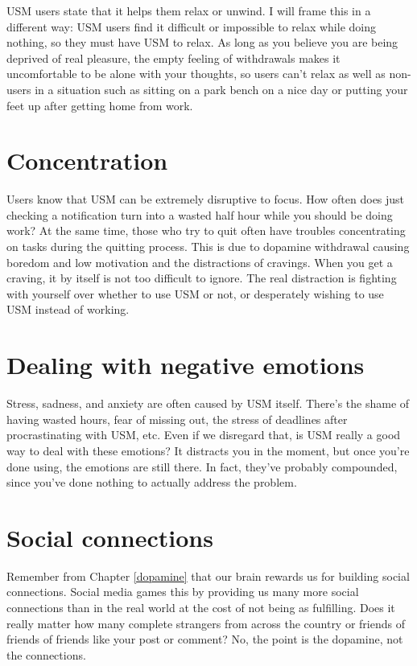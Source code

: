 \documentclass[
  openany]{book}
\begin{document}
USM users state that it helps them relax or unwind. I will frame this in a different way: USM users find it difficult or impossible to relax while doing nothing, so they must have USM to relax. As long as you believe you are being deprived of real pleasure, the empty feeling of withdrawals makes it uncomfortable to be alone with your thoughts, so users can't relax as well as non-users in a situation such as sitting on a park bench on a nice day or putting your feet up after getting home from work.

\section{Concentration}\label{concentration}

Users know that USM can be extremely disruptive to focus. How often does just checking a notification turn into a wasted half hour while you should be doing work? At the same time, those who try to quit often have troubles concentrating on tasks during the quitting process. This is due to dopamine withdrawal causing boredom and low motivation and the distractions of cravings. When you get a craving, it by itself is not too difficult to ignore. The real distraction is fighting with yourself over whether to use USM or not, or desperately wishing to use USM instead of working.

\section{Dealing with negative emotions}\label{dealing-with-negative-emotions}

Stress, sadness, and anxiety are often caused by USM itself. There's the shame of having wasted hours, fear of missing out, the stress of deadlines after procrastinating with USM, etc. Even if we disregard that, is USM really a good way to deal with these emotions? It distracts you in the moment, but once you're done using, the emotions are still there. In fact, they've probably compounded, since you've done nothing to actually address the problem.

\section{Social connections}\label{social-connections}

Remember from Chapter \ref{dopamine} that our brain rewards us for building social connections. Social media games this by providing us many more social connections than in the real world at the cost of not being as fulfilling. Does it really matter how many complete strangers from across the country or friends of friends of friends like your post or comment? No, the point is the dopamine, not the connections.
\end{document}
